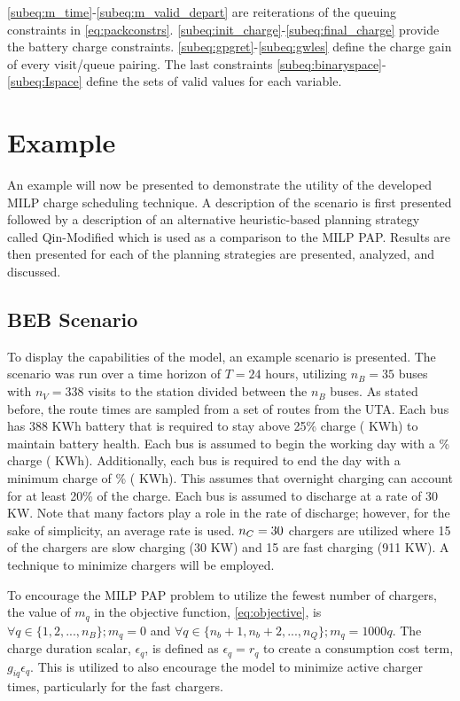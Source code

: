 \documentclass[utf8]{FrontiersinHarvard}
\newcommand{\A}{35 }                                                            %
\newcommand{\N}{338 }                                                           %
\newcommand{\acharge}{0.9}                                                      %
\newcommand{\bcharge}{0.7 }                                                     %
\newcommand{\mincharge}{25\% }                                                  %
\newcommand{\minchargeD}{0.25 }                                                 %
\newcommand{\batsize}{388 }                                                     %
\newcommand{\fast}{15 }                                                         %
\newcommand{\slow}{15 }                                                         %
\newcommand{\fasts}{911 }                                                       %
\newcommand{\slows}{30 }                                                        %
\begin{document}
\autoref{subeq:m_time}-\autoref{subeq:m_valid_depart} are reiterations of the queuing constraints in
\autoref{eq:packconstrs}. \autoref{subeq:init_charge}-\autoref{subeq:final_charge} provide the battery charge
constraints. \autoref{subeq:gpgret}-\autoref{subeq:gwles} define the charge gain of every visit/queue
pairing. The last constraints \autoref{subeq:binaryspace}-\autoref{subeq:Ispace} define the sets of valid values for each
variable.
\section{Example}
\label{sec:example}
An example will now be presented to demonstrate the utility of the developed MILP charge scheduling technique. A
description of the scenario is first presented followed by a description of an alternative heuristic-based planning
strategy called Qin-Modified which is used as a comparison to the MILP PAP. Results are then presented for each of the
planning strategies are presented, analyzed, and discussed.

\subsection{BEB Scenario}
\label{beb-scenario}
To display the capabilities of the model, an example scenario is presented. The scenario was run over a time horizon of
\(T=24\) hours, utilizing \(n_B = \A\) buses with \(n_V = \N\) visits to the station divided between the \(n_B\) buses. As
stated before, the route times are sampled from a set of routes from the UTA. Each bus has \batsize KWh battery that is
required to stay above \mincharge charge (\fpeval{\batsize * \minchargeD} KWh) to maintain battery health. Each bus is
assumed to begin the working day with a \fpeval{\acharge*100}\% charge (\fpeval{\acharge * \batsize} KWh). Additionally,
each bus is required to end the day with a minimum charge of \fpeval{\bcharge * 100}\% (\fpeval{\bcharge * \batsize}
KWh). This assumes that overnight charging can account for at least 20\% of the charge. Each bus is assumed to discharge
at a rate of 30 KW. Note that many factors play a role in the rate of discharge; however, for the sake of simplicity, an
average rate is used. \(n_C = \fpeval{\fast + \slow}\) chargers are utilized where \slow of the chargers are slow charging
(\slows KW) and \fast are fast charging (\fasts KW). A technique to minimize chargers will be employed.

To encourage the MILP PAP problem to utilize the fewest number of chargers, the value of \(m_q\) in the objective
function, \autoref{eq:objective}, is \(\forall q \in \{1,2,..., n_B \}; m_q = 0\) and \(\forall q \in \{n_b + 1, n_b + 2,..., n_Q \}; m_q =
1000q\). The charge duration scalar, \(\epsilon_q\), is defined as \(\epsilon_q = r_q\) to create a consumption cost term, \(g_{iq}\epsilon_q\).
This is utilized to also encourage the model to minimize active charger times, particularly for the fast chargers.
\end{document}
